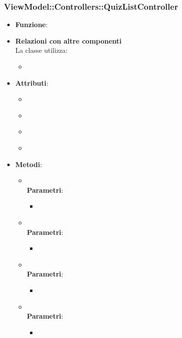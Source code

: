 \subsubsection{ViewModel::Controllers::QuizListController}
\begin{itemize}
\item\textbf{Funzione}:
\item\textbf{Relazioni con altre componenti}\\
La classe utilizza:
	\begin{itemize}
		\item
	\end{itemize}
\item\textbf{Attributi}:
	\begin{itemize}
		\item\code{}\\
		\item\code{}\\
		\item\code{}\\
		\item\code{}\\
	\end{itemize}
\item\textbf{Metodi}:
	\begin{itemize}
		\item\code{}\\
		\textbf{Parametri}:
			\begin{itemize}
				\item\code{}\\
			\end{itemize}
		\item\code{}\\
		\textbf{Parametri}:
			\begin{itemize}
				\item\code{}\\
			\end{itemize}
		\item\code{}\\
		\textbf{Parametri}:
			\begin{itemize}
				\item\code{}\\
			\end{itemize}
		\item\code{}\\
		\textbf{Parametri}:
			\begin{itemize}
				\item\code{}\\
			\end{itemize}
	\end{itemize}
\end{itemize}

